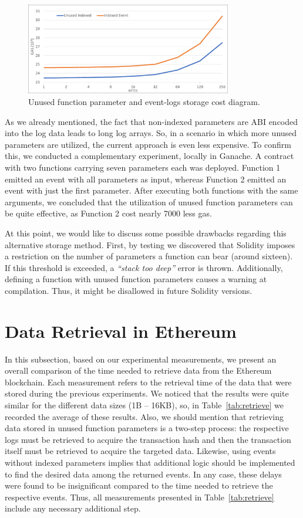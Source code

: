 \begin{figure}[htbp]
\centerline{\includegraphics[width=9cm]{figs/unused.pdf}}
\caption{Unused function parameter and event-logs storage cost diagram.}
\label{fig:unused}
\end{figure}

As we already mentioned, the fact that non-indexed parameters are ABI encoded into the log data leads to long log arrays. So, in a scenario in which more unused parameters are utilized, the current approach is even less expensive. To confirm this, we conducted a complementary experiment, locally in Ganache. A contract with two functions carrying seven parameters each was deployed. Function 1 emitted an event with all parameters as input, whereas Function 2 emitted an event with just the first parameter. After executing both functions with the same arguments, we concluded that the utilization of unused function parameters can be quite effective, as Function 2 cost nearly 7000 less gas.

At this point, we would like to discuss some possible drawbacks regarding this alternative storage method. First, by testing we discovered that Solidity imposes a restriction on the number of parameters a function can bear (around sixteen). If this threshold is exceeded, a \emph{``stack too deep''} error is thrown. Additionally, defining a function with unused function parameters causes a warning at compilation. Thus, it might be disallowed in future Solidity versions.

\section{Data Retrieval in Ethereum}\label{sec:evaluation_ethereum_retrieval}
In this subsection, based on our experimental measurements, we present an overall comparison of the time needed to retrieve data from the Ethereum blockchain. Each measurement refers to the retrieval time of the data that were stored during the previous experiments. We noticed that the results were quite similar for the different data sizes (1B – 16KB), so, in Table~\ref{tab:retrieve} we recorded the average of these results. Also, we should mention that retrieving data stored in unused function parameters is a two-step process: the respective logs must be retrieved to acquire the transaction hash and then the transaction itself must be retrieved to acquire the targeted data. Likewise, using events without indexed parameters implies that additional logic should be implemented to find the desired data among the returned events. In any case, these delays were found to be insignificant compared to the time needed to retrieve the respective events. Thus, all measurements presented in Table~\ref{tab:retrieve} include any necessary additional step.

